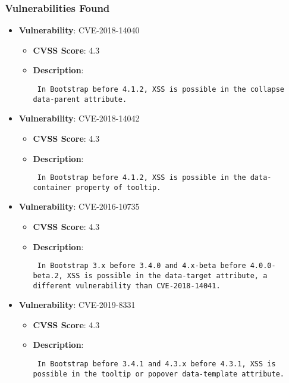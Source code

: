 \documentclass{article}
\begin{document}
\subsubsection*{Vulnerabilities Found}

\begin{itemize}
    
        \item \textbf{Vulnerability}: CVE-2018-14040
        \begin{itemize}
            \item \textbf{CVSS Score}:  4.3 
            \item \textbf{Description}: \parbox{\linewidth}{\texttt{ In Bootstrap before 4.1.2, XSS is possible in the collapse data-parent attribute. }}
        \end{itemize}
    
        \item \textbf{Vulnerability}: CVE-2018-14042
        \begin{itemize}
            \item \textbf{CVSS Score}:  4.3 
            \item \textbf{Description}: \parbox{\linewidth}{\texttt{ In Bootstrap before 4.1.2, XSS is possible in the data-container property of tooltip. }}
        \end{itemize}
    
        \item \textbf{Vulnerability}: CVE-2016-10735
        \begin{itemize}
            \item \textbf{CVSS Score}:  4.3 
            \item \textbf{Description}: \parbox{\linewidth}{\texttt{ In Bootstrap 3.x before 3.4.0 and 4.x-beta before 4.0.0-beta.2, XSS is possible in the data-target attribute, a different vulnerability than CVE-2018-14041. }}
        \end{itemize}
    
        \item \textbf{Vulnerability}: CVE-2019-8331
        \begin{itemize}
            \item \textbf{CVSS Score}:  4.3 
            \item \textbf{Description}: \parbox{\linewidth}{\texttt{ In Bootstrap before 3.4.1 and 4.3.x before 4.3.1, XSS is possible in the tooltip or popover data-template attribute. }}
        \end{itemize}
    

\end{itemize}
\end{document}

